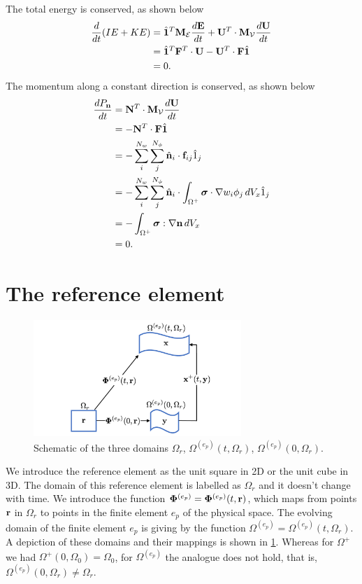 \documentclass[11pt]{report}
\begin{document}
The total energy is conserved, as shown below
\begin{align}
    \frac{d}{dt} (IE + KE) &= \hat{\mathbf{1}}^T \mathbf{M}_\mathcal{E} \frac{d\mathbf{E}}{dt} + \mathbf{U}^T \cdot \mathbf{M}_\mathcal{V} \frac{d\mathbf{U}}{dt} \nonumber \\
    &= \hat{\mathbf{1}}^T \mathbf{F}^T \cdot \mathbf{U} - \mathbf{U}^T \cdot \mathbf{F} \hat{\mathbf{1}} \nonumber \\
    &= 0.
\end{align}
The momentum along a constant direction is conserved, as shown below
\begin{align}
    \frac{d P_{\mathbf{n}}}{dt} &= \mathbf{N}^T \cdot \mathbf{M}_\mathcal{V} \frac{d \mathbf{U}}{dt} \nonumber \\
    &= -\mathbf{N}^T \cdot \mathbf{F} \hat{\mathbf{1}} \nonumber \\
    &= -\sum_i^{N_w} \sum_j^{N_\phi} \hat{\mathbf{n}}_i \cdot \mathbf{f}_{ij} \hat{1}_j \nonumber \\
    &= -\sum_i^{N_w} \sum_j^{N_\phi} \hat{\mathbf{n}}_i \cdot \int_{\Omega^+} \bm \sigma \cdot \nabla w_i \phi_j \, dV_x \hat{1}_j \nonumber \\
    &= -\int_{\Omega^+} \bm \sigma : \nabla \mathbf{n} \, dV_x \nonumber \\
    &= 0.
\end{align}

\section{The reference element}
\begin{figure}[ht]
    \centering
    \includegraphics[width=0.7\textwidth]{../../images/three_spaces.pdf}
    \caption{Schematic of the three domains $\Omega_r$, $\Omega^{(e_p)}(t,\Omega_r)$, $\Omega^{(e_p)}(0,\Omega_r)$.}
    \label{fig:three_spaces}
 \end{figure}
We introduce the reference element as the unit square in 2D or the unit cube in 3D. The domain of this reference element is labelled as $\Omega_r$ and it doesn't change with time. We introduce the function $\bm \Phi^{(e_p)} = \bm \Phi^{(e_p)}(t,\mathbf{r})$, which maps from points $\mathbf{r}$ in $\Omega_r$ to points in the finite element $e_p$ of the physical space. The evolving domain of the finite element $e_p$ is giving  by the function $\Omega^{(e_p)} = \Omega^{(e_p)}(t,\Omega_r)$. A depiction of these domains and their mappings is shown in \cref{fig:three_spaces}. Whereas for $\Omega^+$ we had $\Omega^+(0,\Omega_0)=\Omega_0$, for $\Omega^{(e_p)}$ the analogue does not hold, that is, $\Omega^{(e_p)}(0,\Omega_r) \ne \Omega_r$.
\end{document}
